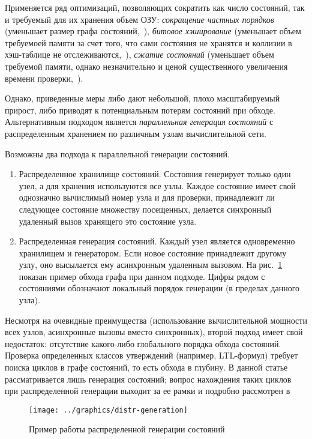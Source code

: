 \documentclass[12pt,a4paper,fleqn]{article}
\begin{document}
Применяется ряд оптимизаций, позволяющих сократить как число состояний, так и требуемый для их хранения объем ОЗУ:
\emph{сокращение частных порядков} (уменьшает размер графа состояний,~\cite{POD}), \emph{битовое хэширование} (уменьшает
объем требуемоей памяти за счет того, что сами состояния не хранятся и коллизии в хэш-таблице не
отслеживаются,~\cite{BitHash1, Wolper}), \emph{сжатие состояний} (уменьшает объем требуемой памяти, однако незначительно
и ценой существенного увеличения времени проверки,~\cite{StateCompr}). 

Однако, приведенные меры либо дают небольшой, плохо масштабируемый прирост, либо приводят к потенциальным потерям
состояний при обходе. Альтернативным подходом является \emph{параллельная генерация состояний} с распределенным
хранением по различным узлам вычислительной сети.

Возможны два подхода к параллельной генерации состояний.

\begin{enumerate}
\item Распределенное хранилище состояний. Состояния генерирует только один узел, а для хранения используются все
  узлы. Каждое состояние имеет свой однозначно вычислимый номер узла и для проверки, принадлежит ли следующее состояние
  множеству посещенных, делается синхронный удаленный вызов хранящего это состояние узла.

\item Распределенная генерация состояний. Каждый узел является одновременно хранилищем и генератором. Если новое
  состояние принадлежит другому узлу, оно высылается ему асинхронным удаленным вызовом. На
  рис.~\ref{fig:distr-generation} показан пример обхода графа при данном подходе. Цифры рядом с состояниями обозначают
  локальный порядок генерации (в пределах данного узла).
\end{enumerate}

Несмотря на очевидные преимущества (использование вычислительной мощности всех узлов, асинхронные вызовы вместо
синхронных), второй подход имеет свой недостаток: отсутствие какого-либо глобального порядка обхода состояний. Проверка
определенных классов утверждений (например, LTL-формул) требует поиска циклов в графе состояний, то есть обхода в
глубину. В данной статье рассматривается лишь генерация состояний; вопрос нахождения таких циклов при распределенной
генерации выходит за ее рамки и подробно рассмотрен в~\cite{DLTL1,DLTL2}

\begin{figure}[ht]
  \centering
  \texttt{[image: ../graphics/distr-generation]}
  \caption{Пример работы распределенной генерации состояний}
  \label{fig:distr-generation}
\end{figure}
\end{document}
